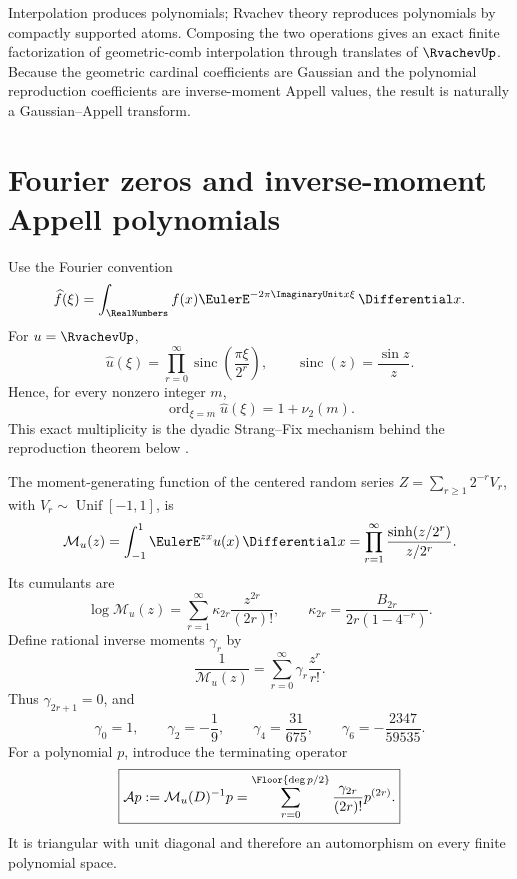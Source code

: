 \documentclass[11pt,oneside]{book}
\numberwithin{equation}{chapter}
\theoremstyle{definition}
\theoremstyle{remark}
\newcommand{\App}{\mathcal A}
\newcommand{\MGF}{\mathcal M}
\DeclareMathOperator{\ord}{ord}
\begin{document}
Interpolation produces polynomials; Rvachev theory reproduces polynomials
by compactly supported atoms.  Composing the two operations gives an exact
finite factorization of geometric-comb interpolation through translates of
$\RvachevUp$.  Because the geometric cardinal coefficients are Gaussian and the
polynomial reproduction coefficients are inverse-moment Appell values, the
result is naturally a Gaussian--Appell transform.

\section{Fourier zeros and inverse-moment Appell polynomials}

Use the Fourier convention
\[
 \widehat f(\xi)=\int_{\RealNumbers}f(x)\EulerE^{-2\pi\ImaginaryUnit x\xi}\,\Differential x.
\]
For $u=\RvachevUp$,
\begin{equation}
 \widehat u(\xi)
 =\prod_{r=0}^{\infty}
   \operatorname{sinc}\!\left(\frac{\pi\xi}{2^r}\right),
 \qquad
 \operatorname{sinc}(z)=\frac{\sin z}{z}.
 \label{eq:up-fourier-product}
\end{equation}
Hence, for every nonzero integer $m$,
\begin{equation}
 \ord_{\xi=m}\widehat u(\xi)=1+\nu_2(m).
 \label{eq:up-integer-zero-order}
\end{equation}
This exact multiplicity is the dyadic Strang--Fix mechanism behind the
reproduction theorem below \cite{RvachevRvachev1972,StrangFix1973}.

The moment-generating function of the centered random series
$Z=\sum_{r\ge1}2^{-r}V_r$, with
$V_r\sim\operatorname{Unif}[-1,1]$, is
\begin{equation}
 \MGF_u(z)=\int_{-1}^{1}\EulerE^{zx}u(x)\,\Differential x
 =\prod_{r=1}^{\infty}
   \frac{\sinh(z/2^r)}{z/2^r}.
 \label{eq:up-mgf}
\end{equation}
Its cumulants are
\begin{equation}
 \log\MGF_u(z)
 =\sum_{r=1}^{\infty}\kappa_{2r}\frac{z^{2r}}{(2r)!},
 \qquad
 \kappa_{2r}=\frac{B_{2r}}{2r(1-4^{-r})}.
 \label{eq:up-cumulants}
\end{equation}
Define rational inverse moments $\gamma_r$ by
\begin{equation}
 \frac1{\MGF_u(z)}
 =\sum_{r=0}^{\infty}\gamma_r\frac{z^r}{r!}.
 \label{eq:up-inverse-moments}
\end{equation}
Thus $\gamma_{2r+1}=0$, and
\begin{equation}
 \gamma_0=1,
 \qquad \gamma_2=-\frac19,
 \qquad \gamma_4=\frac{31}{675},
 \qquad \gamma_6=-\frac{2347}{59535}.
 \label{eq:up-first-inverse-moments}
\end{equation}
For a polynomial $p$, introduce the terminating operator
\begin{equation}
 \boxed{
 \App p:=\MGF_u(D)^{-1}p
 =\sum_{r=0}^{\Floor{\deg p/2}}
   \frac{\gamma_{2r}}{(2r)!}p^{(2r)}.}
 \label{eq:up-Appell-operator}
\end{equation}
It is triangular with unit diagonal and therefore an automorphism on every
finite polynomial space.
\end{document}
